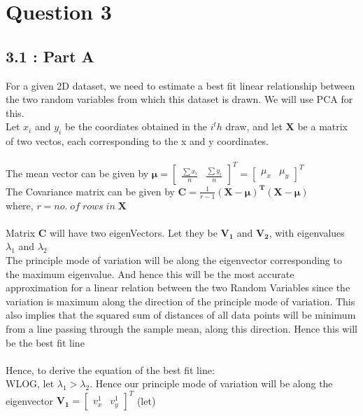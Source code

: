\documentclass[12pt, a4paper]{article}
\begin{document}
\section*{Question 3}
\subsection*{3.1 : Part A}
\hspace{1cm} For a given 2D dataset, we need to estimate a best fit linear relationship between the two random variables from which this dataset is drawn. We will use PCA for this. \\ 
Let $x_i$ and $y_i$ be the coordiates obtained in the $i^th$ draw, and let $\mathbf{X}$ be a matrix of two vectos, each corresponding to the x and y coordinates.\\ \\
The mean vector can be given by $\boldsymbol{\mu} =  
\begin{bmatrix}
\frac{\sum x_i}{n} &  \frac{\sum y_i}{n} 
\end{bmatrix}^T  = 
\begin{bmatrix}
\mu_x &  \mu_y 
\end{bmatrix}^T $ \\
The Covariance matrix can be given by $\mathbf{C} = \frac{1}{r-1}\mathbf{(X-\boldsymbol{\mu})^T(X-\boldsymbol{\mu})}$ \\ where, $r = no. \; of\; rows\; in\; \mathbf{X}$ \\ \\
Matrix $\mathbf{C}$ will have two eigenVectors. Let they be $\mathbf{V_1}$ and $\mathbf{V_2}$, with eigenvalues \\ $\lambda_1$ and $\lambda_2$ \\ 

The principle mode of variation will be along the eigenvector corresponding to the maximum eigenvalue. And hence this will be the most accurate approximation for a linear relation between the two Random Variables since the variation is maximum along the direction of the principle mode of variation. This also implies that the squared sum of distances of all data points will be minimum from a line passing through the sample mean, along this direction. Hence this will be the best fit line \\  \\
Hence, to derive the equation of the best fit line: \\
WLOG, let $\lambda_1 > \lambda_2$. Hence our principle mode of variation will be along the eigenvector $\mathbf{V_1} = \begin{bmatrix}
v^1_x &  v^1_y 
\end{bmatrix}^T $ (let) 
\end{document}
